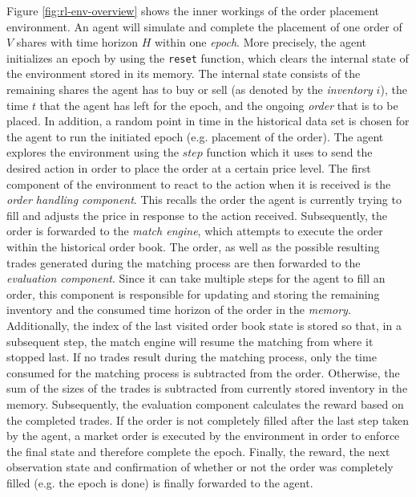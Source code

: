 Figure \ref{fig:rl-env-overview} shows the inner workings of the order placement environment.
An agent will simulate and complete the placement of one order of $V$ shares with time horizon $H$ within one \textit{epoch}.
More precisely, the agent initializes an epoch by using the \texttt{reset} function, which clears the internal state of the environment stored in its memory.
The internal state consists of the remaining shares the agent has to buy or sell (as denoted by the \textit{inventory} $i$), the time $t$ that the agent has left for the epoch, and the ongoing \textit{order} that is to be placed.
In addition, a random point in time in the historical data set is chosen for the agent to run the initiated epoch (e.g. placement of the order).
The agent explores the environment using the $step$ function which it uses to send the desired action in order to place the order at a certain price level.
The first component of the environment to react to the action when it is received is the \textit{order handling component}. This recalls the order the agent is currently trying to fill and adjusts the price in response to the action received.
Subsequently, the order is forwarded to the \textit{match engine}, which attempts to execute the order within the historical order book.
The order, as well as the possible resulting trades generated during the matching process are then forwarded to the \textit{evaluation component}.
Since it can take multiple steps for the agent to fill an order, this component is responsible for updating and storing the remaining inventory and the consumed time horizon of the order in the \textit{memory}.
Additionally, the index of the last visited order book state is stored so that, in a subsequent step, the match engine will resume the matching from where it stopped last.
If no trades result during the matching process, only the time consumed for the matching process is subtracted from the order.
Otherwise, the sum of the sizes of the trades is subtracted from currently stored inventory in the memory.
Subsequently, the evaluation component calculates the reward based on the completed trades.
If the order is not completely filled after the last step taken by the agent, a market order is executed by the environment in order to enforce the final state and therefore complete the epoch.
Finally, the reward, the next observation state and confirmation of whether or not the order was completely filled (e.g. the epoch is done) is finally forwarded to the agent.

